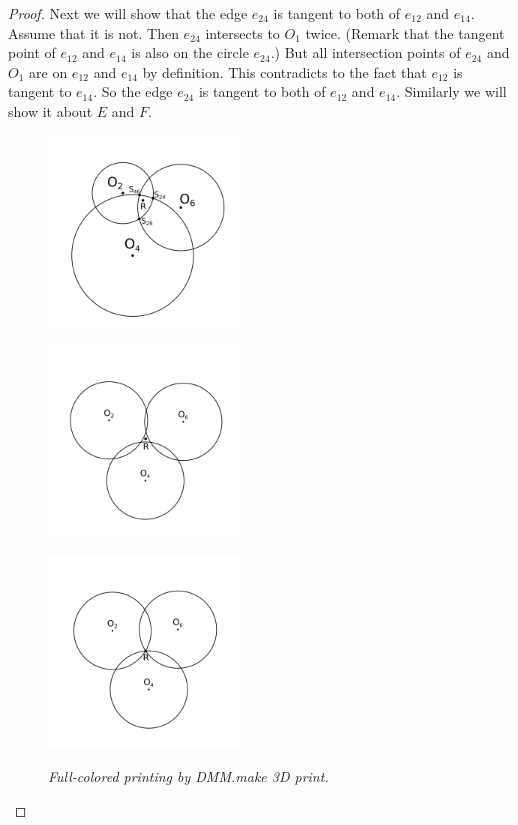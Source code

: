 \documentclass[dvipdfmx]{interact}
\theoremstyle{plain}%
\theoremstyle{definition}
\theoremstyle{remark}
\theoremstyle{problemstyle}
\begin{document}
\begin{proof}
Next we will show that the edge $e_{24}$ is tangent to both of $e_{12}$ and
 $e_{14}$. Assume that it is not. Then $e_{24}$ intersects to $O_1$
 twice.
(Remark that the tangent point of $e_{12}$ and $e_{14}$ is also on the
 circle $e_{24}$.) But all intersection points of $e_{24}$ and $O_1$ are
 on $e_{12}$ and $e_{14}$ by definition. This contradicts to the fact
 that $e_{12}$ is tangent to $e_{14}$. So the edge $e_{24}$ is tangent
 to both of $e_{12}$ and $e_{14}$. Similarly we will show it about $E$
 and $F$.

\begin{figure}[h!tbp]
  \begin{minipage}[t]{0.3\textwidth}
   \centering
   \includegraphics[width=2in, keepaspectratio]{./img/HexahedraWithSphericalFaces/threeCircles1.png}
   \subcaption{}
   \label{fig:}
  \end{minipage}
 \hspace*{\fill}
  \begin{minipage}[t]{0.3\textwidth}
   \centering
   \includegraphics[width=2in, keepaspectratio]{./img/HexahedraWithSphericalFaces/threeCircles2.png}
   \subcaption{}
   \label{fig:}
  \end{minipage}
  \hspace*{\fill}
  \begin{minipage}[t]{0.3\textwidth}
   \centering
   \includegraphics[width=2in, keepaspectratio]{./img/HexahedraWithSphericalFaces/threeCircles3.png}
   \label{fig:3dcolPlastic}
  \end{minipage}
  \caption{\textit{Full-colored printing by DMM.make 3D print.}}
  \label{fig:3dcol}
\end{figure}



\end{proof}
\end{document}
